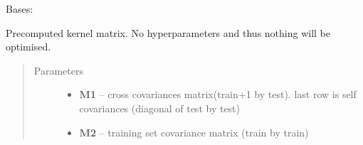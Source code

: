 \documentclass[letterpaper,10pt,english]{sphinxmanual}
\begin{document}
\begin{fulllineitems}
\label{pyGPs.Core:pyGPs.Core.cov.Pre}
Bases: 

Precomputed kernel matrix. No hyperparameters and thus nothing will be optimised.
\begin{quote}\begin{description}
\item[{Parameters}] \leavevmode\begin{itemize}
\item {} 
\textbf{M1} -- cross covariances matrix(train+1 by test).
last row is self covariances (diagonal of test by test)

\item {} 
\textbf{M2} -- training set covariance matrix (train by train)

\end{itemize}

\end{description}\end{quote}

\begin{fulllineitems}
\label{pyGPs.Core:pyGPs.Core.cov.Pre.getCovMatrix}
\end{fulllineitems}


\begin{fulllineitems}
\label{pyGPs.Core:pyGPs.Core.cov.Pre.getDerMatrix}
\end{fulllineitems}


\end{fulllineitems}

\end{document}
